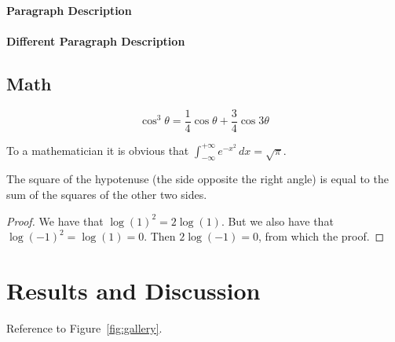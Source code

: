\documentclass[
10pt, %
a4paper, %
oneside, %
headinclude,footinclude, %
BCOR5mm, %
]{scrartcl}
\begin{document}
\lipsum[6] %

\paragraph{Paragraph Description} \lipsum[7] %

\paragraph{Different Paragraph Description} \lipsum[8] %


\subsection{Math}

\lipsum[4] %

\begin{equation}
\cos^3 \theta =\frac{1}{4}\cos\theta+\frac{3}{4}\cos 3\theta
\label{eq:refname2}
\end{equation}

\lipsum[5] %

\begin{definition}[Gauss] 
To a mathematician it is obvious that
$\int_{-\infty}^{+\infty}
e^{-x^2}\,dx=\sqrt{\pi}$. 
\end{definition} 

\begin{theorem}[Pythagoras]
The square of the hypotenuse (the side opposite the right angle) is equal to the sum of the squares of the other two sides.
\end{theorem}

\begin{proof} 
We have that $\log(1)^2 = 2\log(1)$.
But we also have that $\log(-1)^2=\log(1)=0$.
Then $2\log(-1)=0$, from which the proof.
\end{proof}


\section{Results and Discussion}

Reference to Figure~\vref{fig:gallery}. %
\end{document}
